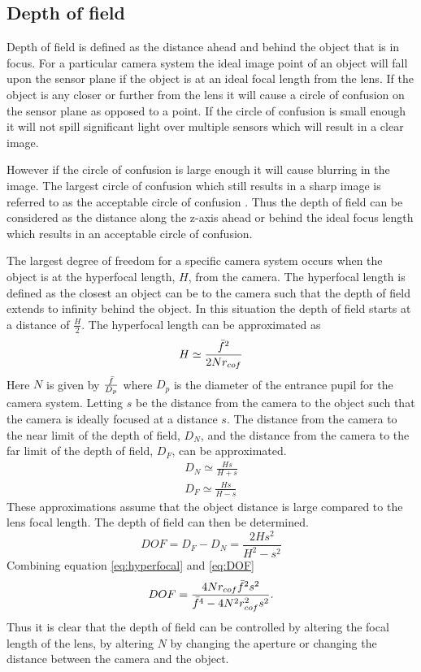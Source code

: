 \documentclass[[12pt,oneside,openany,a4paper, %
\newcommand*\mean[1]{\bar{#1}} %
\begin{document}
\subsection{Depth of field}
Depth of field is defined as the distance ahead and behind the object that is in focus. For a particular camera system the ideal image point of an object will fall upon the sensor plane if the object is at an ideal focal length from the lens. If the object is any closer or further from the lens it will cause a circle of confusion on the sensor plane as opposed to a point. If the circle of confusion is small enough it will not spill significant light over multiple sensors which will result in a clear image.%

However if the circle of confusion is large enough it will cause blurring in the image. The largest circle of confusion which still results in a sharp image is referred to as the acceptable circle of confusion \cite{sutton2009image}. Thus the depth of field can be considered as the distance along the z-axis ahead or behind the ideal focus length which results in an acceptable circle of confusion.

The largest degree of freedom for a specific camera system occurs when the object is at the hyperfocal length, $H$, from the camera. The hyperfocal length is defined as the closest an object can be to the camera such that the depth of field extends to infinity behind the object. In this situation the depth of field starts at a distance of $\frac{H}{2}$. The hyperfocal length can be approximated as
\begin{equation}
  H \simeq \frac{\mean{f}^2}{2 N r_{cof}}
  \label{eq:hyperfocal}
\end{equation}
Here $N$ is given by $\frac{\mean{f}}{D_p}$ where $D_p$ is the diameter of the entrance pupil for the camera system. Letting $s$ be the distance from the camera to the object such that the camera is ideally focused at a distance $s$. The distance from the camera to the near limit of the depth of field, $D_N$, and the distance from the camera to the far limit of the depth of field, $D_F$, can be approximated.
\begin{align}
  D_N \simeq \frac{Hs}{H+s} \\
  D_F \simeq \frac{Hs}{H-s}
\end{align}
These approximations assume that the object distance is large compared to the lens focal length. The depth of field can then be determined.
\begin{equation}
  DOF = D_F - D_N = \frac{2 H s^2}{H^2 - s^2}
  \label{eq:DOF}
\end{equation}
Combining equation \ref{eq:hyperfocal} and \ref{eq:DOF} 
\begin{equation}
  DOF = \frac{4 N r_{cof} \mean{f}^2 s^2}{\mean{f}^4 - 4 N^2 r_{cof}^2 s^2}.
\end{equation}
Thus it is clear that the depth of field can be controlled by altering the focal length of the lens, by altering $N$ by changing the aperture or changing the distance between the camera and the object.
\end{document}
